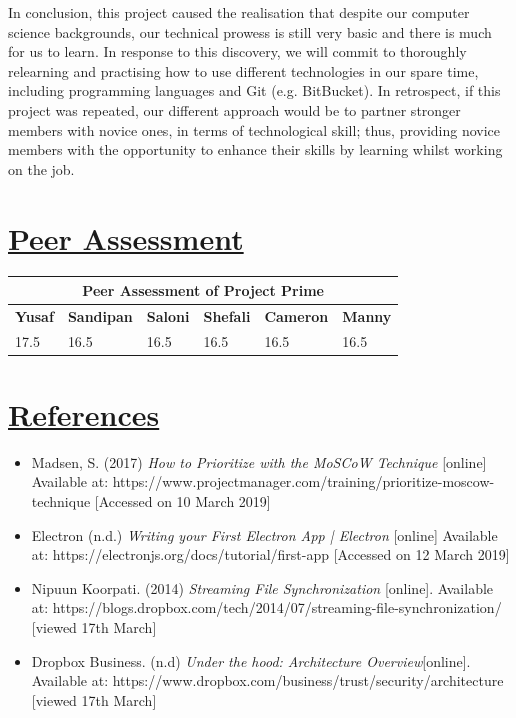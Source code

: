 \documentclass{article}
\begin{document}
\noindent In conclusion, this project caused the realisation that despite our computer science backgrounds, our technical prowess is still very basic and there is much for us to learn. In response to this discovery, we will commit to thoroughly relearning and practising how to use different technologies in our spare time, including programming languages and Git (e.g. BitBucket). In retrospect, if this project was repeated, our different approach would be to partner stronger members with novice ones, in terms of technological skill; thus, providing novice members with the opportunity to enhance their skills by learning whilst working on the job.   

\section{\underline{Peer Assessment}}
\begin{tabular}{|p{2cm}|p{2cm}|p{2cm}|p{2cm}|p{2cm}|p{2cm}|}
\hline
\multicolumn{6}{|c|}{\textbf{Peer Assessment of Project Prime}} \\
\hline
\textbf{Yusaf} & \textbf{Sandipan} & \textbf{Saloni} & \textbf{Shefali} & \textbf{Cameron} & \textbf{Manny} \\
\hline
17.5 & 16.5 & 16.5 & 16.5 & 16.5 & 16.5 \\
\hline
\end{tabular}
	
\section{\underline{References}}
\begin{itemize}
\item Madsen, S. (2017) \textit{How to Prioritize with the MoSCoW Technique} [online] Available at: https://www.projectmanager.com/training/prioritize-moscow-technique [Accessed on 10 March 2019]
\item Electron (n.d.) \textit{Writing your First Electron App | Electron} [online] Available at: https://electronjs.org/docs/tutorial/first-app [Accessed on 12 March 2019]
\item Nipuun Koorpati. (2014) \textit{Streaming File Synchronization } [online]. Available at: https://blogs.dropbox.com/tech/2014/07/streaming-file-synchronization/ [viewed 17th March]
\item Dropbox Business. (n.d) \textit{Under the hood: Architecture Overview}[online].  Available at: https://www.dropbox.com/business/trust/security/architecture [viewed 17th March]
\end{itemize}
\
\end{document}
